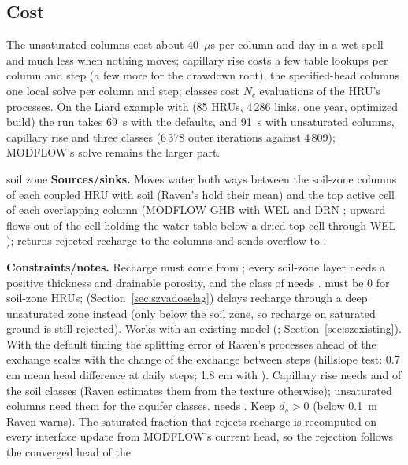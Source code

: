 \subsection{Cost}\label{sec:szcost}
The unsaturated columns cost about 40~$\mu$s per column and day in a wet spell and much less when nothing moves;
capillary rise costs a few table lookups per column and step (a few more for the drawdown root), the specified-head columns one local solve per column and step; classes
cost $N_c$ evaluations of the HRU's processes. On the Liard example with  (85 HRUs, 4\,286 links,
one year, optimized build) the run takes 69~s with the defaults, and 91~s with unsaturated columns, capillary rise
and three classes (6\,378 outer iterations against 4\,809); MODFLOW's solve remains the larger part.

\begin{refcard}{soil zone}
\textbf{Sources/sinks.} Moves water both ways between the soil-zone columns of each coupled HRU with soil (Raven's
 hold their mean) and the top active cell of each overlapping column (MODFLOW GHB  with WEL
 and DRN ; upward flows out of the cell holding the water table below a dried top cell
through WEL ); returns rejected recharge to the columns and sends overflow to .\par\smallskip
\textbf{Constraints/notes.} Recharge must come from ; every soil-zone layer needs a positive thickness and
drainable porosity, and the class of  needs .  must be 0 for
soil-zone HRUs;  (Section~\ref{sec:szvadoselag}) delays recharge through a deep unsaturated zone instead
(only below the soil zone, so recharge on saturated ground is still rejected). Works with an existing model (; Section~\ref{sec:szexisting}). With the default
 timing the splitting error of Raven's processes ahead of the exchange scales with the change of the
exchange between steps (hillslope test: 0.7 cm mean head difference at daily steps; 1.8 cm with ).
Capillary rise needs  and  of the soil classes (Raven estimates them from the
texture otherwise); unsaturated columns need them for the aquifer classes.  needs
. Keep $d_s>0$ (below 0.1~m Raven warns). The saturated fraction that rejects recharge is
recomputed on every interface update from MODFLOW's current head, so the rejection follows the converged head of the

\end{refcard}
